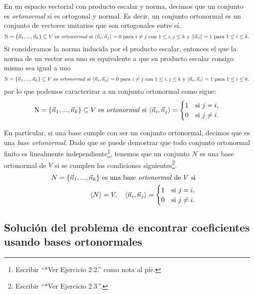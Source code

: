 \documentclass[12pt,dvipsnames]{article}
\numberwithin{equation}{section}
\begin{document}
En un espacio vectorial con producto escalar y norma, decimos que un conjunto es \emph{ortonormal} si es ortogonal y normal. Es decir, un conjunto ortonormal es un conjunto de vectores unitarios que son ortogonales entre sí.
\[
    \text{N}=\{\vec{n}_1,...,\vec{n}_k\}\subseteq V \ \text{es \emph{ortonormal} si} \ \langle \vec{n}_i , \vec{n}_j \rangle = 0 \text{ para } i\neq j \text{ con } 1\le i,j\le k \text{ y } ||\vec{n}_i||=1 \text{ para } 1\le i\le k.
\]
Si consideramos la norma inducida por el producto escalar, entonces el que la norma de un vector sea uno es equivalente a que su producto escalar consigo mismo sea igual a uno
\[
    \text{N}=\{\vec{n}_1,...,\vec{n}_k\}\subseteq V \ \text{es \emph{ortonormal} si} \ \langle \vec{n}_i , \vec{n}_j \rangle = 0 \text{ para } i\neq j \text{ con } 1\le i,j\le k \text{ y } \langle \vec{n}_i , \vec{n}_i \rangle=1 \text{ para } 1\le i\le k.
\]
por lo que podemos caracterizar a un conjunto ortonormal como sigue:
\[
    \text{N}=\{\vec{n}_1,...,\vec{n}_k\}\subseteq V \ \text{es \emph{ortonormal} si} \ \langle \vec{n}_i , \vec{n}_j \rangle = \begin{cases} 1 &\text{si } j=i, \\ 0 &\text{si } j\neq i. \end{cases}
\]

En particular, si una base cumple con ser un conjunto ortonormal, decimos que es una \emph{base ortonormal}. Dado que se puede demostrar que todo conjunto ortonormal finito es linealmente independiente\footnote{Escribir ``*Ver Ejercicio 2.2.'' como nota al pie.}, tenemos que un conjunto $N$ es una base ortonormal de $V$ si se cumplen las condiciones siguientes\footnote{Escribir ``*Ver Ejercicio 2.3.''.}. 
\begin{align*}
    N=\{\vec{n}_1,...,\vec{n}_k\} \text{ es una base \emph{ortonormal} de } V \text{ si}& & &\\
    \langle N \rangle = V, \quad \langle \vec{n}_i , \vec{n}_j \rangle = \begin{cases} 1 &\text{si } j=i, \\ 0 &\text{si } j\neq i. \end{cases}
\end{align*}

\subsection{Solución del problema de encontrar coeficientes usando bases ortonormales}
\end{document}
